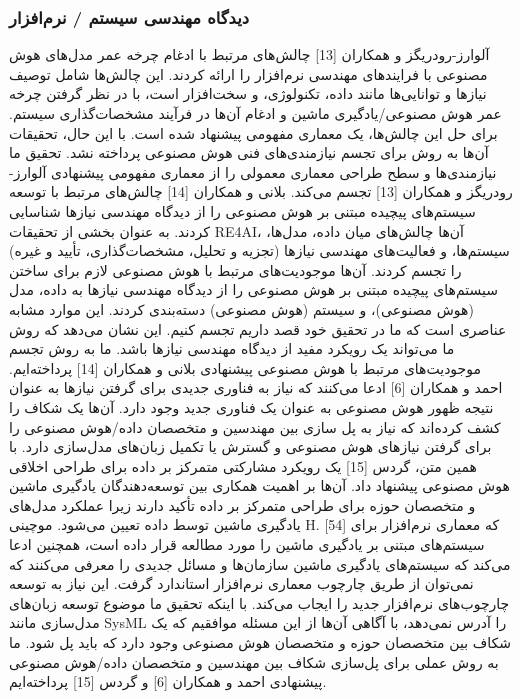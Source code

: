 \documentclass[a4paper,10pt]{article}
\begin{document}
            \subsubsection{دیدگاه مهندسی سیستم / نرم‌افزار}

                آلوارز-رودریگز و همکاران [13] چالش‌های مرتبط با ادغام چرخه عمر مدل‌های هوش مصنوعی با فرایندهای مهندسی نرم‌افزار را ارائه کردند. این چالش‌ها شامل توصیف نیازها و توانایی‌ها مانند داده، تکنولوژی، و سخت‌افزار است، با در نظر گرفتن چرخه عمر هوش مصنوعی/یادگیری ماشین و ادغام آن‌ها در فرآیند مشخصات‌گذاری سیستم. برای حل این چالش‌ها، یک معماری مفهومی پیشنهاد شده است. با این حال، تحقیقات آن‌ها به روش برای تجسم نیازمندی‌های فنی هوش مصنوعی پرداخته نشد. تحقیق ما نیازمندی‌ها و سطح طراحی معماری معمولی را از معماری مفهومی پیشنهادی آلوارز-رودریگز و همکاران [13] تجسم می‌کند. بلانی و همکاران [14] چالش‌های مرتبط با توسعه سیستم‌های پیچیده مبتنی بر هوش مصنوعی را از دیدگاه مهندسی نیازها شناسایی کردند. به عنوان بخشی از تحقیقات RE4AI، آن‌ها چالش‌های میان داده، مدل‌ها، سیستم‌ها، و فعالیت‌های مهندسی نیازها (تجزیه و تحلیل، مشخصات‌گذاری، تأیید و غیره) را تجسم کردند. آن‌ها موجودیت‌های مرتبط با هوش مصنوعی لازم برای ساختن سیستم‌های پیچیده مبتنی بر هوش مصنوعی را از دیدگاه مهندسی نیازها به داده، مدل (هوش مصنوعی)، و سیستم (هوش مصنوعی) دسته‌بندی کردند. این موارد مشابه عناصری است که ما در تحقیق خود قصد داریم تجسم کنیم. این نشان می‌دهد که روش ما می‌تواند یک رویکرد مفید از دیدگاه مهندسی نیازها باشد. ما به روش تجسم موجودیت‌های مرتبط با هوش مصنوعی پیشنهادی بلانی و همکاران [14] پرداخته‌ایم. احمد و همکاران [6] ادعا می‌کنند که نیاز به فناوری جدیدی برای گرفتن نیازها به عنوان نتیجه ظهور هوش مصنوعی به عنوان یک فناوری جدید وجود دارد. آن‌ها یک شکاف را کشف کرده‌اند که نیاز به پل سازی بین مهندسین و متخصصان داده/هوش مصنوعی را برای گرفتن نیازهای هوش مصنوعی و گسترش یا تکمیل زبان‌های مدل‌سازی دارد. با همین متن، گردس [15] یک رویکرد مشارکتی متمرکز بر داده برای طراحی اخلاقی هوش مصنوعی پیشنهاد داد. آن‌ها بر اهمیت همکاری بین توسعه‌دهندگان یادگیری ماشین و متخصصان حوزه برای طراحی متمرکز بر داده تأکید دارند زیرا عملکرد مدل‌های یادگیری ماشین توسط داده تعیین می‌شود. موچینی H. [54] که معماری نرم‌افزار برای سیستم‌های مبتنی بر یادگیری ماشین را مورد مطالعه قرار داده است، همچنین ادعا می‌کند که سیستم‌های یادگیری ماشین سازمان‌ها و مسائل جدیدی را معرفی می‌کنند که نمی‌توان از طریق چارچوب معماری نرم‌افزار استاندارد گرفت. این نیاز به توسعه چارچوب‌های نرم‌افزار جدید را ایجاب می‌کند. با اینکه تحقیق ما موضوع توسعه زبان‌های مدل‌سازی مانند SysML را آدرس نمی‌دهد، با آگاهی آن‌ها از این مسئله موافقیم که یک شکاف بین متخصصان حوزه و متخصصان هوش مصنوعی وجود دارد که باید پل شود. ما به روش عملی برای پل‌سازی شکاف بین مهندسین و متخصصان داده/هوش مصنوعی پیشنهادی احمد و همکاران [6] و گردس [15] پرداخته‌ایم.
\end{document}
